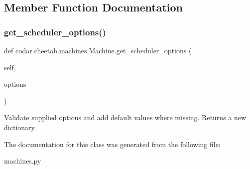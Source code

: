 \subsection{Member Function Documentation}
\mbox{\label{classcodar_1_1cheetah_1_1machines_1_1_machine_ab0b2099ced6d7abf518832a173ed1c14}} 
\subsubsection{\texorpdfstring{get\+\_\+scheduler\+\_\+options()}{get\_scheduler\_options()}}
{\footnotesize\ttfamily def codar.\+cheetah.\+machines.\+Machine.\+get\+\_\+scheduler\+\_\+options (\begin{DoxyParamCaption}\item[{}]{self,  }\item[{}]{options }\end{DoxyParamCaption})}

\begin{DoxyVerb}Validate supplied options and add default values where missing.
Returns a new dictionary.\end{DoxyVerb}
 

The documentation for this class was generated from the following file\+:\begin{DoxyCompactItemize}
\item 
machines.\+py\end{DoxyCompactItemize}
